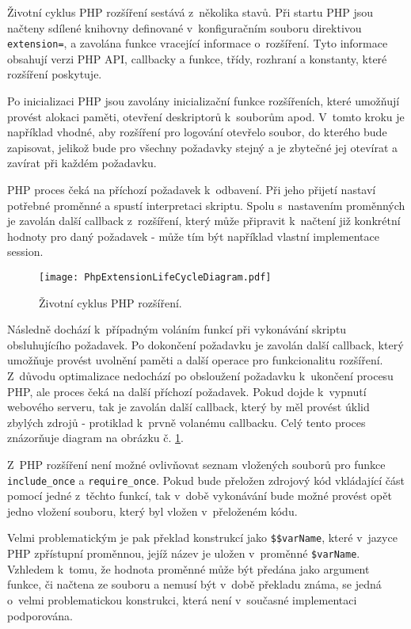 \documentclass[czech]{ExcelAtFIT}
\newcommand{\function}[1]{\texttt{#1}}
\begin{document}
	Životní cyklus PHP rozšíření sestává z~několika stavů.\cite{phpExtensionLife} Při startu PHP jsou načteny sdílené knihovny definované v~konfiguračním souboru direktivou \function{ex\-ten\-sion=}, a zavolána funkce vracející informace o~rozšíření. Tyto informace obsahují verzi PHP API, callbacky a funkce, třídy, rozhraní a konstanty, které rozšíření poskytuje.\cite{phpExtensionStructure}

	Po inicializaci PHP jsou zavolány inicializační funkce rozšířeních, které umožňují provést alokaci paměti, otevření deskriptorů k~souborům apod. V~tomto kroku je například vhodné, aby rozšíření pro logování otevřelo soubor, do kterého bude zapisovat, jelikož bude pro všechny požadavky stejný a je zbytečné jej otevírat a zavírat při každém požadavku.

	PHP proces čeká na pří\-cho\-zí požadavek k~odbavení. Při jeho přijetí nastaví potřebné proměnné a spustí interpretaci skriptu. Spolu s~nastavením proměnných je zavolán další callback z~rozšíření, který může připravit k~načtení již konkrétní hodnoty pro daný požadavek - může tím být například vlastní implementace session.

	\begin{figure}[t]
		\centering
		\texttt{[image: PhpExtensionLifeCycleDiagram.pdf]}
		\caption{Životní cyklus PHP rozšíření.}
		\label{fig:phpExtensionLifeCycle}
	\end{figure}


	Následně dochází k~případným voláním funkcí při vykonávání skriptu obsluhujícího požadavek. Po dokončení požadavku je zavolán další callback, který umožňuje provést uvolnění paměti a další operace pro funkcionalitu rozšíření. Z~důvodu optimalizace nedochází po obsloužení požadavku k~ukončení procesu PHP, ale proces čeká na další příchozí požadavek. Pokud dojde k~vypnutí webového serveru, tak je zavolán další callback, který by měl provést úklid zbylých zdrojů - protiklad k~prvně volanému callbacku. Celý tento proces znázorňuje diagram na obrázku č. \ref{fig:phpExtensionLifeCycle}.


	Z~PHP rozšíření není možné ovlivňovat seznam vložených souborů pro funkce \function{include\_once} a \function{re\-qui\-re\_on\-ce}. Pokud bude přeložen zdrojový kód vkládající část pomocí jedné z~těchto funkcí, tak v~době vykonávání bude možné provést opět jedno vložení souboru, který byl vložen v~přeloženém kódu.

	Velmi problematickým je pak překlad konstrukcí jako \function{\$\$varName}, které v~jazyce PHP zpřístupní pro\-měn\-nou, jejíž název je uložen v~proměnné \function{\$varName}. Vzhledem k~tomu, že hodnota proměnné může být předána jako argument funkce, či načtena ze souboru a nemusí být v~době překladu známa, se jedná o~velmi problematickou konstrukci, která není v~současné implementaci podporována.
\end{document}
